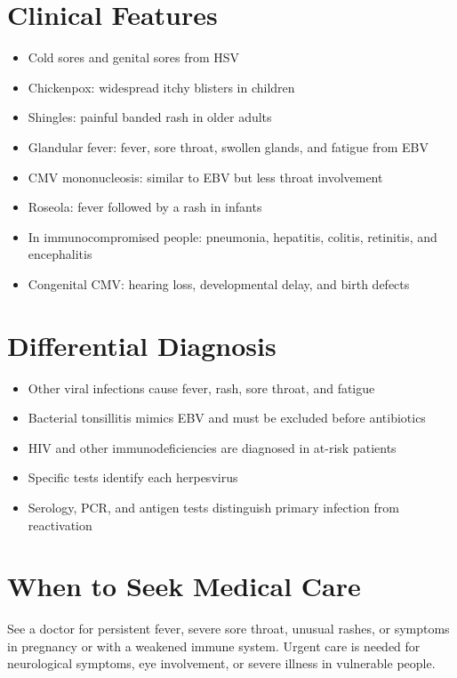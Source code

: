 \section*{Clinical Features}
\begin{itemize}
    \item Cold sores and genital sores from HSV
    \item Chickenpox: widespread itchy blisters in children
    \item Shingles: painful banded rash in older adults
    \item Glandular fever: fever, sore throat, swollen glands, and fatigue from EBV
    \item CMV mononucleosis: similar to EBV but less throat involvement
    \item Roseola: fever followed by a rash in infants
    \item In immunocompromised people: pneumonia, hepatitis, colitis, retinitis, and encephalitis
    \item Congenital CMV: hearing loss, developmental delay, and birth defects
\end{itemize}

\section*{Differential Diagnosis}
\begin{itemize}
    \item Other viral infections cause fever, rash, sore throat, and fatigue
    \item Bacterial tonsillitis mimics EBV and must be excluded before antibiotics
    \item HIV and other immunodeficiencies are diagnosed in at-risk patients
    \item Specific tests identify each herpesvirus
    \item Serology, PCR, and antigen tests distinguish primary infection from reactivation
\end{itemize}

\section*{When to Seek Medical Care}
See a doctor for persistent fever, severe sore throat, unusual rashes, or symptoms in pregnancy or with a weakened immune system. Urgent care is needed for neurological symptoms, eye involvement, or severe illness in vulnerable people.

